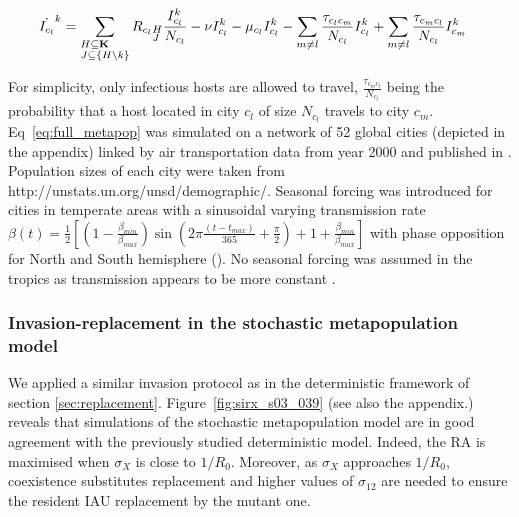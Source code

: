 \begin{footnotesize}
\begin{align}
    \dot{I_{c_l}}^k &= \sum_{\begin{subarray}{l}H \subseteq \mathbf{K}
        \\ J \subseteq \{H \setminus k \} \end{subarray}}
    {R_{c_l}}_{\begin{subarray}{l}H \\ J \end{subarray}}
    \frac{I_{c_l}^k}{N_{c_l}} -\nu I_{c_l}^k -\mu_{c_l} I_{c_l}^k
    -\sum_{m\neq l} \frac{\tau_{c_lc_m}}{N_{c_l}} I_{c_l}^k
    +\sum_{m\neq l} \frac{\tau_{c_mc_l}}{N_{c_l}} I_{c_m}^k \notag
  \end{align}
\end{footnotesize}

For simplicity, only infectious hosts are allowed to travel,
$\frac{\tau_{c_mc_l}}{N_{c_l}}$ being the probability that a host
located in city $c_l$ of size $N_{c_l}$ travels to city $c_m$.
Eq~\eqref{eq:full_metapop} was simulated on a network of 52 global
cities (depicted in the appendix) linked by air transportation data
from year 2000 and published in \citep{Grais2003}. Population sizes of
each city were taken from http://unstats.un.org/unsd/demographic/.
Seasonal forcing was introduced for cities in temperate areas with a
sinusoidal varying transmission rate $\beta(t)= \frac{1}{2} \left[
  (1-\frac{\beta_{min}}{\beta_{max}}) \sin(2 \pi
  \frac{(t-t_{max})}{365}+\frac{\pi}{2}) +1
  +\frac{\beta_{min}}{\beta_{max}} \right]$ with phase opposition for
North and South hemisphere (\citep{Finkelman2007}). No seasonal
forcing was assumed in the tropics as transmission appears to be more
constant \citep{Viboud2006}.

\subsubsection{Invasion-replacement in the stochastic metapopulation model}

We applied a similar invasion protocol as in the deterministic
framework of section \ref{sec:replacement}.
Figure~\ref{fig:sirx_s03_039} (see also the appendix.) reveals that
simulations of the stochastic metapopulation model are in good
agreement with the previously studied deterministic model. Indeed, the
RA is maximised when $\sigma_{X}$ is close to $1/R_0$. Moreover, as
$\sigma_{X}$ approaches $1/R_0$, coexistence substitutes replacement
and higher values of $\sigma_{12}$ are needed to ensure the resident
IAU replacement by the mutant one.

